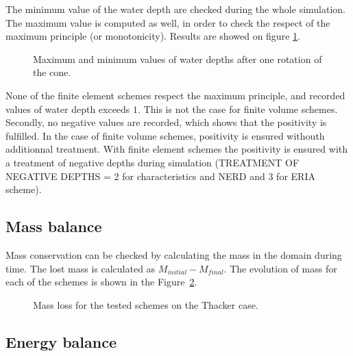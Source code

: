 The minimum value of the water depth are checked during the whole simulation. 
The maximum value is computed as well, in order to check the respect of the maximum principle (or monotonicity). 
Results are showed on figure \ref{t2d:stoker:minmax}. 

\begin{figure}[H]
\centering
{}
\caption{Maximum and minimum values of water depths after one rotation of the cone.}
\label{t2d:stoker:minmax}
\end{figure}

None of the finite element schemes respect the maximum principle, and recorded values of water depth exceeds $1$.
This is not the case for finite volume schemes.
Secondly, no negative values are recorded, which shows that the positivity is fulfilled.
In the case of finite volume schemes, positivity is ensured withouth additionnal treatment.
With finite element schemes the positivity is ensured with a treatment of negative depths
during simulation (TREATMENT OF NEGATIVE DEPTHS = 2 for characteristics and NERD and 3 for ERIA scheme).

\subsection{Mass balance}

Mass conservation can be checked by calculating the mass in the domain during time.
The lost mass is calculated as $M_{initial} - M_{final}$.
The evolution of mass for each of the schemes is shown in the Figure~\ref{fig:stoker:VoLTime}.

\begin{figure}[H]
\centering
  \caption{Mass loss for the tested schemes on the Thacker case.}
\label{fig:stoker:VoLTime}
\end{figure}

\subsection{Energy balance}

